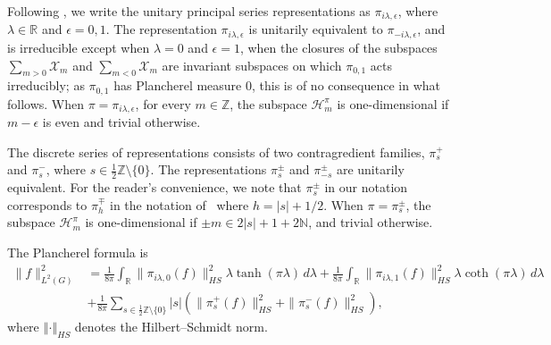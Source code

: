 \documentclass[12pt,a4paper]{amsart}
\theoremstyle{definition}
\theoremstyle{remark}
\numberwithin{equation}{section}
\newcommand{\norm}[1]{\left\Vert#1\right\Vert}
\newcommand{\R}{\mathbb{R}}
\newcommand{\Z}{\mathbb{Z}}
\newcommand{\Hil}{\mathcal{H}}
\newcommand{\Ban}{\mathcal{X}}
\newcommand{\var}{s}
\begin{document}
Following \cite{ACD,BCNT}, we write the unitary principal series representations as $\pi_{i\lambda,\epsilon}$, where $\lambda\in \mathbb R$ and $\epsilon=0,1$.  
The representation  $\pi_{i\lambda,\epsilon}$ is unitarily equivalent to $\pi_{-i\lambda,\epsilon}$, and is  irreducible except  when $\lambda =0$ and $\epsilon=1$, when the closures of the subspaces $\sum_{m>0} \Ban_m$ and $\sum_{m< 0} \Ban_m$ are invariant subspaces on which $\pi_{0,1}$ acts irreducibly;
as $\pi_{0,1}$ has Plancherel measure $0$, this is of no consequence in what follows.
When $\pi=\pi_{i\lambda,\epsilon}$, for every $m\in \Z$, the subspace $\Hil^{\pi}_m$ is one-dimensional if $m-\epsilon$ is even and trivial otherwise.


The discrete series of representations consists of two contragredient families, $\pi_\var^+$ and  $\pi_\var^-$, where $\var\in \frac12\mathbb Z\setminus\{0\}$. 
The representations $\pi_\var^\pm$ and $\pi_{-\var}^\pm$ are unitarily equivalent.  
For the reader's convenience, we note that $\pi_{\var}^\pm$ in our notation corresponds to $\pi_h^\mp$  in the notation of~\cite{BCNT} where  $h=|\var|+1/2 $.
When $\pi=\pi^\pm_s$, the subspace $\Hil^{\pi}_m$  is one-dimensional if $\pm m\in 2|\var| +1 + 2\mathbb N $, and trivial otherwise. 

The Plancherel formula is
\begin{equation}\label{e:plancherel}
\begin{aligned}
\|f\|_{L^2(G)}^2&=\frac{1}{8\pi} \int_\R \|\pi_{i\lambda,0}(f)\|_{HS}^2 \lambda\tanh(\pi\lambda)\, d\lambda
+
 \frac{1}{8\pi} \int_\R \|\pi_{i\lambda,1}(f)\|_{HS}^2 \lambda\coth(\pi\lambda)\, d\lambda
 \\
 &+\frac{1}{8\pi} \sum_{s\in \frac12 \Z \setminus\{0\}} |s| \left(\|\pi_s^+(f)\|_{HS}^2 +\|\pi_s^-(f)\|_{HS}^2 \right) ,
\end{aligned}
\end{equation}
where $\norm{\cdot}_{HS}$ denotes the Hilbert--Schmidt norm.
%
 
\end{document}
